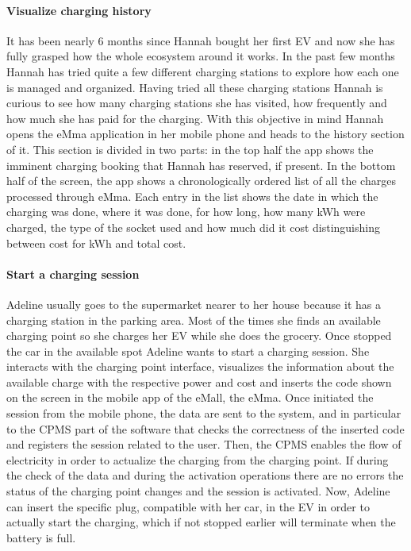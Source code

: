 \paragraph{Visualize charging history}
It has been nearly 6 months since Hannah bought her first EV and now she has fully grasped how the whole ecosystem around it works. In the past few months Hannah has tried quite a few different charging stations to explore how each one is managed and organized. Having tried all these charging stations Hannah is curious to see how many charging stations she has visited, how frequently and how much she has paid for the charging. With this objective in mind Hannah opens the eMma application in her mobile phone and heads to the history section of it. This section is divided in two parts: in the top half the app shows the imminent charging booking that Hannah has reserved, if present. In the bottom half of the screen, the app shows a chronologically ordered list of all the charges processed through eMma. Each entry in the list shows the date in which the charging was done, where it was done, for how long, how many kWh were charged, the type of the socket used and how much did it cost distinguishing between cost for kWh and total cost.

\paragraph{Start a charging session}
Adeline usually goes to the supermarket nearer to her house because it has a charging station in the parking area. Most of the times she finds an available charging point so she charges her EV while she does the grocery. Once stopped the car in the available spot Adeline wants to start a charging session. She interacts with the charging point interface, visualizes the information about the available charge with the respective power and cost and inserts the code shown on the screen in the mobile app of the eMall, the eMma. Once initiated the session from the mobile phone, the data are sent to the system, and in particular to the CPMS part of the software that checks the correctness of the inserted code and registers the session related to the user. Then, the CPMS enables the flow of electricity in order to actualize the charging from the charging point. If during the check of the data and during the activation operations there are no errors the status of the charging point changes and the session is activated. Now, Adeline can insert the specific plug, compatible with her car, in the EV in order to actually start the charging, which if not stopped earlier will terminate when the battery is full.

